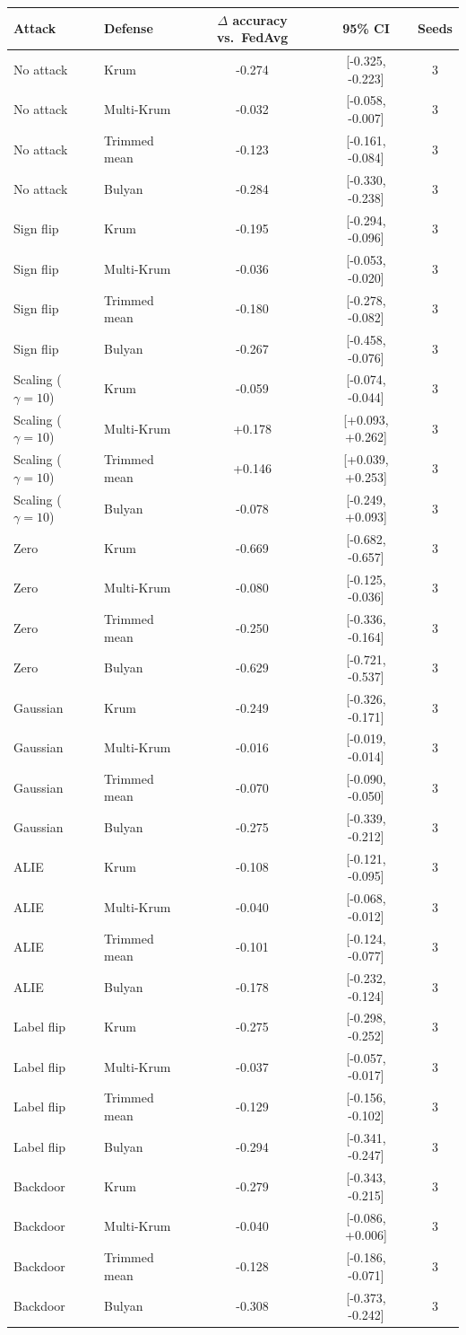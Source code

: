 \begin{tabular}{llccc}
\toprule
Attack & Defense & $\Delta$ accuracy vs.\ FedAvg & 95\% CI & Seeds \\
\midrule
No attack & Krum & -0.274 & [-0.325, -0.223] & 3 \\
No attack & Multi-Krum & -0.032 & [-0.058, -0.007] & 3 \\
No attack & Trimmed mean & -0.123 & [-0.161, -0.084] & 3 \\
No attack & Bulyan & -0.284 & [-0.330, -0.238] & 3 \\
Sign flip & Krum & -0.195 & [-0.294, -0.096] & 3 \\
Sign flip & Multi-Krum & -0.036 & [-0.053, -0.020] & 3 \\
Sign flip & Trimmed mean & -0.180 & [-0.278, -0.082] & 3 \\
Sign flip & Bulyan & -0.267 & [-0.458, -0.076] & 3 \\
Scaling ($\gamma=10$) & Krum & -0.059 & [-0.074, -0.044] & 3 \\
Scaling ($\gamma=10$) & Multi-Krum & +0.178 & [+0.093, +0.262] & 3 \\
Scaling ($\gamma=10$) & Trimmed mean & +0.146 & [+0.039, +0.253] & 3 \\
Scaling ($\gamma=10$) & Bulyan & -0.078 & [-0.249, +0.093] & 3 \\
Zero & Krum & -0.669 & [-0.682, -0.657] & 3 \\
Zero & Multi-Krum & -0.080 & [-0.125, -0.036] & 3 \\
Zero & Trimmed mean & -0.250 & [-0.336, -0.164] & 3 \\
Zero & Bulyan & -0.629 & [-0.721, -0.537] & 3 \\
Gaussian & Krum & -0.249 & [-0.326, -0.171] & 3 \\
Gaussian & Multi-Krum & -0.016 & [-0.019, -0.014] & 3 \\
Gaussian & Trimmed mean & -0.070 & [-0.090, -0.050] & 3 \\
Gaussian & Bulyan & -0.275 & [-0.339, -0.212] & 3 \\
ALIE & Krum & -0.108 & [-0.121, -0.095] & 3 \\
ALIE & Multi-Krum & -0.040 & [-0.068, -0.012] & 3 \\
ALIE & Trimmed mean & -0.101 & [-0.124, -0.077] & 3 \\
ALIE & Bulyan & -0.178 & [-0.232, -0.124] & 3 \\
Label flip & Krum & -0.275 & [-0.298, -0.252] & 3 \\
Label flip & Multi-Krum & -0.037 & [-0.057, -0.017] & 3 \\
Label flip & Trimmed mean & -0.129 & [-0.156, -0.102] & 3 \\
Label flip & Bulyan & -0.294 & [-0.341, -0.247] & 3 \\
Backdoor & Krum & -0.279 & [-0.343, -0.215] & 3 \\
Backdoor & Multi-Krum & -0.040 & [-0.086, +0.006] & 3 \\
Backdoor & Trimmed mean & -0.128 & [-0.186, -0.071] & 3 \\
Backdoor & Bulyan & -0.308 & [-0.373, -0.242] & 3 \\
\bottomrule
\end{tabular}
